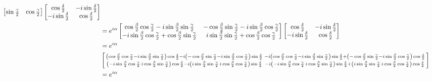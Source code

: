\documentclass[en]{sol-man}
\begin{document}
\begin{sol}
\begin{align}
\begin{bmatrix}
            \sin\frac{\gamma}{2}&\cos\frac{\gamma}{2}
        \end{bmatrix}\begin{bmatrix}
            \cos\frac{\delta}{2}&-i\sin\frac{\delta}{2}\\
            -i\sin\frac{\delta}{2}&\cos\frac{\delta}{2}
        \end{bmatrix}\\
        \notag&=e^{i\alpha}\begin{bmatrix}
            \cos\frac{\beta}{2}\cos\frac{\gamma}{2}-i\sin\frac{\beta}{2}\sin\frac{\gamma}{2}&-\cos\frac{\beta}{2}\sin\frac{\gamma}{2}-i\sin\frac{\beta}{2}\cos\frac{\gamma}{2}\\
            -i\sin\frac{\beta}{2}\cos\frac{\gamma}{2}+\cos\frac{\beta}{2}\sin\frac{\gamma}{2}&i\sin\frac{\beta}{2}\sin\frac{\gamma}{2}+\cos\frac{\beta}{2}\cos\frac{\gamma}{2}
        \end{bmatrix}\begin{bmatrix}
            \cos\frac{\delta}{2}&-i\sin\frac{\delta}{2}\\
            -i\sin\frac{\delta}{2}&\cos\frac{\delta}{2}
        \end{bmatrix}\\
        \notag&=e^{i\alpha}\\
        \notag&\left[\begin{smallmatrix}
            \left(\cos\frac{\beta}{2}\cos\frac{\gamma}{2}-i\sin\frac{\beta}{2}\sin\frac{\gamma}{2}\right)\cos\frac{\delta}{2}-i\left(-\cos\frac{\beta}{2}\sin\frac{\gamma}{2}-i\sin\frac{\beta}{2}\cos\frac{\gamma}{2}\right)\sin\frac{\delta}{2}&-i\left(\cos\frac{\beta}{2}\cos\frac{\gamma}{2}-i\sin\frac{\beta}{2}\sin\frac{\gamma}{2}\right)\sin\frac{\delta}{2}+\left(-\cos\frac{\beta}{2}\sin\frac{\gamma}{2}-i\sin\frac{\beta}{2}\cos\frac{\gamma}{2}\right)\cos\frac{\delta}{2}\\
            \left(-i\sin\frac{\beta}{2}\cos\frac{\gamma}{2}+\cos\frac{\beta}{2}\sin\frac{\gamma}{2}\right)\cos\frac{\delta}{2}-i\left(i\sin\frac{\beta}{2}\sin\frac{\gamma}{2}+\cos\frac{\beta}{2}\cos\frac{\gamma}{2}\right)\sin\frac{\delta}{2}&-i\left(-i\sin\frac{\beta}{2}\cos\frac{\gamma}{2}+\cos\frac{\beta}{2}\sin\frac{\gamma}{2}\right)\sin\frac{\delta}{2}+\left(i\sin\frac{\beta}{2}\sin\frac{\gamma}{2}+\cos\frac{\beta}{2}\cos\frac{\gamma}{2}\right)\cos\frac{\delta}{2}
        \end{smallmatrix}\right]\\
        \notag&=e^{i\alpha}\\

\end{align}
\end{sol}
\end{document}
